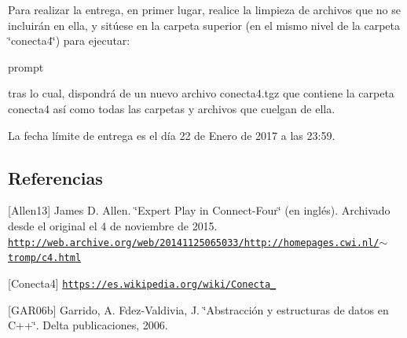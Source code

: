Para realizar la entrega, en primer lugar, realice la limpieza de archivos que no se incluirán en ella, y sitúese en la carpeta superior (en el mismo nivel de la carpeta \char`\"{}conecta4\char`\"{}) para ejecutar\-: 
\begin{DoxyCode}
prompt%
\end{DoxyCode}
 tras lo cual, dispondrá de un nuevo archivo conecta4.\-tgz que contiene la carpeta conecta4 así como todas las carpetas y archivos que cuelgan de ella.

La fecha límite de entrega es el día 22 de Enero de 2017 a las 23\-:59.\hypertarget{index_referencias}{}\subsection{Referencias}\label{index_referencias}
\mbox{[}Allen13\mbox{]} James D. Allen. \char`\"{}\-Expert Play in Connect-\/\-Four\char`\"{} (en inglés). Archivado desde el original el 4 de noviembre de 2015. \href{http://web.archive.org/web/20141125065033/http://homepages.cwi.nl/~tromp/c4.html}{\tt http\-://web.\-archive.\-org/web/20141125065033/http\-://homepages.\-cwi.\-nl/$\sim$tromp/c4.\-html}

\mbox{[}Conecta4\mbox{]} \href{https://es.wikipedia.org/wiki/Conecta_4}{\tt https\-://es.\-wikipedia.\-org/wiki/\-Conecta\-\_}

\mbox{[}G\-A\-R06b\mbox{]} Garrido, A. Fdez-\/\-Valdivia, J. \char`\"{}\-Abstracción y estructuras de datos en C++\char`\"{}. Delta publicaciones, 2006. 